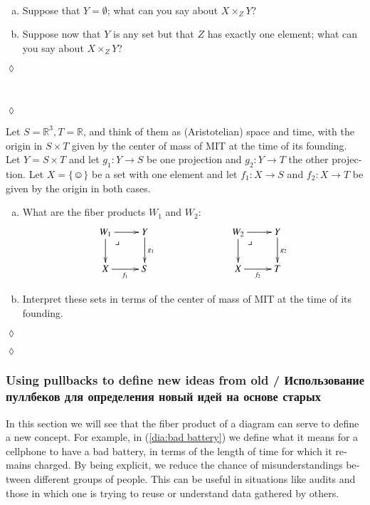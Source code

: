 \documentclass[a4paper]{book}
\makeatletter
\def\RR{{\mathbb R}}
\def\singleton{\{\smiley\}}
\def\to{\rightarrow}
\def\taking{\colon}
\def\ullimit{\ar@{}[rd]|(.3)*+{\lrcorner}}
\theoremstyle{myth}
\newtheorem{excENG}[envENG]{\begin{english}Exercise\end{english}}
\newenvironment{exerciseENG}{\begin{excENG}}{\hspace*{\fill}$\lozenge$\end{excENG}}
\newtheorem{remarkRUS}[envRUS]{\begin{russian}Примечание\end{russian}}
\newtheorem{excRUS}[envRUS]{\begin{russian}Упражнение\end{russian}}
\newenvironment{exerciseRUS}{\begin{excRUS}}{\hspace*{\fill}$\lozenge$\end{excRUS}}
\def\sexc{\begin{enumerate}[a.)]\setlength{\itemsep}{.1cm}\setlength{\parskip}{.1cm}\item}
\def\next{\item}
\def\endsexc{\end{enumerate}}
\makeatother
\begin{document}
\begin{english}
\begin{remarkRUS}
\begin{russian} \end{russian}
\end{remarkRUS}

\begin{exerciseENG}~
\sexc Suppose that $Y=\emptyset$; what can you say about $X\times_ZY$? 
\next Suppose now that $Y$ is any set but that $Z$ has exactly one element; what can you say about $X\times_ZY$?
\endsexc
\end{exerciseENG}

\begin{exerciseRUS}~
\begin{russian} \end{russian}
\end{exerciseRUS}

\begin{exerciseENG}
Let $S=\RR^3, T=\RR$, and think of them as (Aristotelian) space and time, with the origin in $S\times T$ given by the center of mass of MIT at the time of its founding. Let $Y=S\times T$ and let $g_1\taking Y\to S$ be one projection and $g_2\taking Y\to T$ the other projection. Let $X=\singleton$ be a set with one element and let $f_1\taking X\to S$ and $f_2\taking X\to T$ be given by the origin in both cases. 
\sexc What are the fiber products $W_1$ and $W_2$:
$$
\xymatrix{W_1\ar[r]\ar[d]\ullimit&Y\ar[d]^{g_1}\\X\ar[r]_{f_1}&S}\hspace{1in}
\xymatrix{W_2\ar[r]\ar[d]\ullimit&Y\ar[d]^{g_2}\\X\ar[r]_{f_2}&T}
$$
\next Interpret these sets in terms of the center of mass of MIT at the time of its founding.
\endsexc
\end{exerciseENG}

\begin{exerciseRUS}
\begin{russian} \end{russian}
\end{exerciseRUS}


\subsubsection{Using pullbacks to define new ideas from old / Использование пуллбеков для определения новый идей на основе старых}

In this section we will see that the fiber product of a diagram can serve to define a new concept. For example, in (\ref{dia:bad battery}) we define what it means for a cellphone to have a bad battery, in terms of the length of time for which it remains charged. By being explicit, we reduce the chance of misunderstandings between different groups of people. This can be useful in situations like audits and those in which one is trying to reuse or understand data gathered by others.


\end{english}
\end{document}

